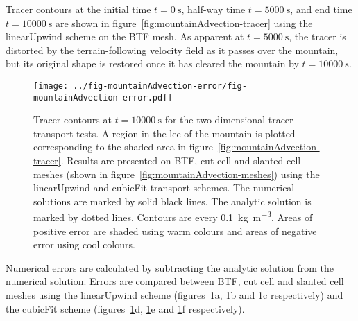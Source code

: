 Tracer contours at the initial time $t=\SI{0}{\second}$, half-way time $t=\SI{5000}{\second}$, and end time $t=\SI{10000}{\second}$ are shown in figure~\ref{fig:mountainAdvection-tracer} using the linearUpwind scheme on the BTF mesh.  As apparent at $t=\SI{5000}{\second}$, the tracer is distorted by the terrain-following velocity field as it passes over the mountain, but its original shape is restored once it has cleared the mountain by $t=\SI{10000}{\second}$.

\begin{figure}
	\centering
	\texttt{[image: ../fig-mountainAdvection-error/fig-mountainAdvection-error.pdf]}
	\caption{Tracer contours at $t=\SI{10000}{\second}$ for the two-dimensional tracer transport tests.  A region in the lee of the mountain is plotted corresponding to the shaded area in figure~\ref{fig:mountainAdvection-tracer}.  Results are presented on BTF, cut cell and slanted cell meshes (shown in figure~\ref{fig:mountainAdvection-meshes}) using the linearUpwind and cubicFit transport schemes.  The numerical solutions are marked by solid black lines.  The analytic solution is marked by dotted lines.  Contours are every \SI{0.1}{\kilo\gram\per\meter\cubed}.  Areas of positive error are shaded using warm colours and areas of negative error using cool colours.}
	\label{fig:mountainAdvection-errors}
\end{figure}

Numerical errors are calculated by subtracting the analytic solution from the numerical solution.  Errors are compared between BTF, cut cell and slanted cell meshes using the linearUpwind scheme (figures~\ref{fig:mountainAdvection-errors}a, \ref{fig:mountainAdvection-errors}b and \ref{fig:mountainAdvection-errors}c respectively) and the cubicFit scheme (figures~\ref{fig:mountainAdvection-errors}d, \ref{fig:mountainAdvection-errors}e and \ref{fig:mountainAdvection-errors}f respectively).



